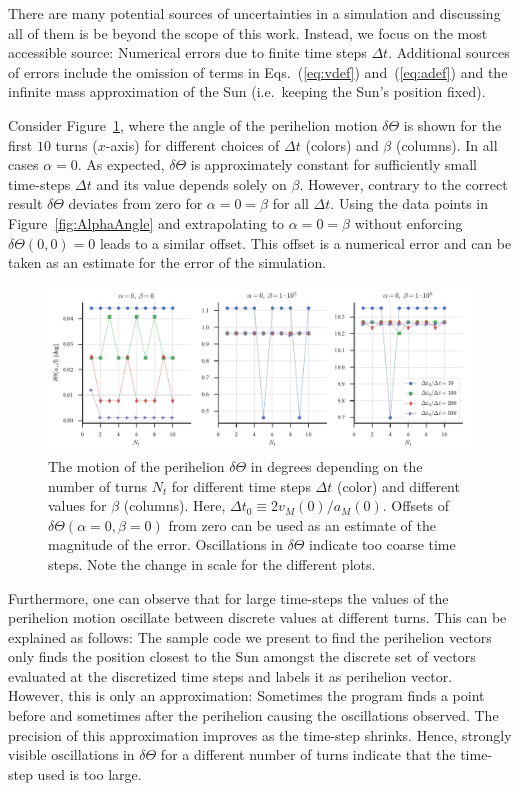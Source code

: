 \documentclass[12pt,ngerman,american]{iopart}
\begin{document}
There are many potential sources of uncertainties in a simulation and discussing all of them is be beyond the scope of this work.
Instead, we focus on the most accessible source: Numerical errors due to finite time steps $\Delta t$.
Additional sources of errors include the omission of terms in Eqs.~(\ref{eq:vdef}) and~(\ref{eq:adef}) and the infinite mass approximation of the Sun (i.e.\ keeping the Sun's position fixed).

Consider Figure~\ref{fcc3}, where the angle of the perihelion motion $\delta \Theta$ is shown for the first $10$ turns ($x$-axis) for different choices of $\Delta t$ (colors) and $\beta$ (columns). In all cases $\alpha=0$.
As expected, $\delta\Theta$ is approximately constant for sufficiently small time-steps $\Delta t$ and its value depends solely on $\beta$.
However, contrary to the correct result $\delta\Theta$ deviates from zero for $\alpha = 0 = \beta$ for all $\Delta t$.
Using the data points in Figure~\ref{fig:AlphaAngle} and extrapolating to $\alpha = 0 = \beta$ without enforcing $\delta\Theta(0,0) = 0$ leads to a similar offset.
This offset is a numerical error and can be taken as an estimate for the error of the simulation.

\begin{figure}[htb]
	\centering
	\includegraphics[width=.99\textwidth]{figs/angular-variaton.pdf}
	\caption{\label{fcc3}The motion of the perihelion $\delta\Theta$ in degrees depending on the number of turns $N_t$ for different time steps $\Delta t$ (color) and different values for $\beta$ (columns).
	Here, $\Delta t_0 \equiv 2 v_M(0)/a_M(0)$.
	Offsets of $\delta \Theta(\alpha=0, \beta=0)$ from zero can be used as an estimate of the magnitude of the error. Oscillations in $\delta \Theta$ indicate too coarse time steps.
	Note the change in scale for the different plots.
}
\end{figure}

Furthermore, one can observe that for large time-steps the values of the perihelion motion oscillate between discrete values at different turns.
This can be explained as follows: The sample code we present to find the perihelion vectors only finds the position closest to the Sun amongst
the discrete set of vectors evaluated at the discretized time steps and labels it as perihelion vector. However,
this is only an approximation: Sometimes the program finds a point before and sometimes after the perihelion causing the oscillations observed.
The precision of this approximation improves as the time-step shrinks.
Hence, strongly visible oscillations in $\delta\Theta$ for a different number of turns indicate that the time-step used is too large.
\end{document}
